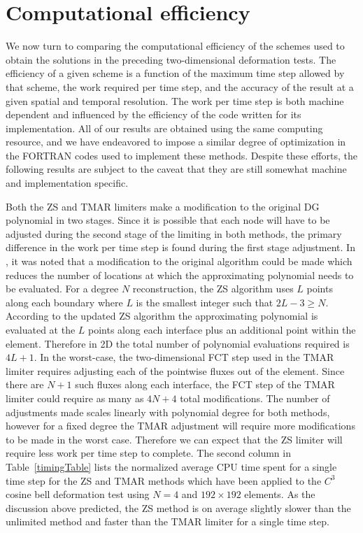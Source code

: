 \documentclass{ametsoc}
\begin{document}
\section{Computational efficiency} \label{sec:Efficiency}

We now turn to comparing the computational efficiency of the schemes used to obtain the solutions in the preceding two-dimensional deformation tests. The efficiency of a given scheme is a function of the maximum time step allowed by that scheme, the work required per time step, and the accuracy of the result at a given spatial and temporal resolution.  The work per time step is both machine dependent and influenced by the efficiency of the code written for its implementation. All of our results are obtained using the same computing resource, and we have endeavored to impose a similar degree of optimization in the FORTRAN codes used to implement these methods. Despite these efforts, the following results are subject to the caveat that they are still somewhat machine and implementation specific.

Both the ZS and TMAR limiters make a modification to the original DG polynomial in two stages. Since it is possible that each node will have to be adjusted during the second stage of the limiting in both methods, the primary difference in the work per time step is found during the first stage adjustment. In \citet{Zhang:2011aa}, it was noted that a modification to the original algorithm could be made which reduces the number of locations at which the approximating polynomial needs to be evaluated. For a degree $N$ reconstruction, the ZS algorithm uses $L$ points along each boundary where $L$ is the smallest integer such that $2L-3 \geq N$. According to the updated ZS algorithm the approximating polynomial is evaluated at the $L$ points along each interface plus an additional point within the element. Therefore in 2D the total number of polynomial evaluations required is $4L+1$. In the worst-case, the two-dimensional FCT step used in the TMAR limiter requires adjusting each of the pointwise fluxes out of the element. Since there are $N+1$ such fluxes along each interface, the FCT step of the TMAR limiter could require as many as $4N+4$ total modifications. The number of adjustments made scales linearly with polynomial degree for both methods, however for a fixed degree the TMAR adjustment will require more modifications to be made in the worst case. Therefore we can expect that the ZS limiter will require less work per time step to complete. The second column in Table~\ref{timingTable} lists the normalized average CPU time spent for a single time step for the ZS and TMAR methods which have been applied to the $C^3$ cosine bell deformation test using $N=4$ and $192\times192$ elements. As the discussion above predicted, the ZS method is on average slightly slower than the unlimited method and faster than the TMAR limiter for a single time step. 
\end{document}
